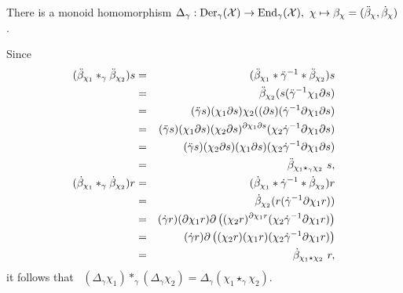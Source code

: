 \newpage
\begin{thm} \label{thm:Delta}
There is a monoid homomorphism 
$\Delta_{\gamma} : \mathrm{Der}_{\gamma}(\mathcal{X}) \to \mathrm{End}_{\gamma}(\mathcal{X}),~ 
                   \chi \mapsto \beta_{\chi} = (\ddot{\beta}_{\chi},\dot{\beta}_{\chi})$.
\end{thm}
\begin{pf}
Since 
\vspace*{-9mm} 
\begin{eqnarray*}
(\ddot{\beta}_{\chi_1} \ast_{\gamma} \ddot{\beta}_{\chi_2})s 
 &=& (\ddot{\beta}_{\chi_1} * \ddot{\gamma}^{-1} * \ddot{\beta}_{\chi_2})s \\ 
 &=& \ddot{\beta}_{\chi_2}(s(\ddot{\gamma}^{-1}\chi_1\partial s)  \\ 
 &=& (\ddot{\gamma} s)(\chi_1\partial s)\chi_2((\partial s)
       (\dot{\gamma}^{-1}\partial\chi_1\partial s) \\ 
 &=& (\ddot{\gamma} s)(\chi_1\partial s)(\chi_2\partial s)^{\partial\chi_1\partial s} 
       (\chi_2\dot{\gamma}^{-1}\partial\chi_1\partial s) \\ 
 &=& (\ddot{\gamma} s)(\chi_2\partial s)(\chi_1\partial s)
       (\chi_2\dot{\gamma}^{-1}\partial\chi_1\partial s) \\ 
 &=& \ddot{\beta}_{\chi_1 \star_{\gamma} \chi_2}\ s, \\
(\dot{\beta}_{\chi_1} \ast_{\gamma} \dot{\beta}_{\chi_2})r 
 &=& (\dot{\beta}_{\chi_1} * \dot{\gamma}^{-1} * \dot{\beta}_{\chi_2})r \\ 
 &=& \dot{\beta}_{\chi_2}(r(\dot{\gamma}^{-1}\partial\chi_1 r)) \\
 &=& (\dot{\gamma} r)(\partial\chi_1 r)\partial\left( 
       (\chi_2 r)^{\partial\chi_1r}(\chi_2\dot{\gamma}^{-1}\partial\chi_1 r)\right) \\ 
 &=& (\dot{\gamma} r)\partial\left( 
       (\chi_2r)(\chi_1r)(\chi_2\dot{\gamma}^{-1}\partial\chi_1 r)\right) \\
 &=& \dot{\beta}_{\chi_1\star\chi_2}\ r, 
\end{eqnarray*}
it follows that~ 
$(\Delta_{\gamma}\chi_1) \ast_{\gamma} (\Delta_{\gamma}\chi_2) 
 = \Delta_{\gamma}(\chi_1 \star_{\gamma} \chi_2)$.
\end{pf}


